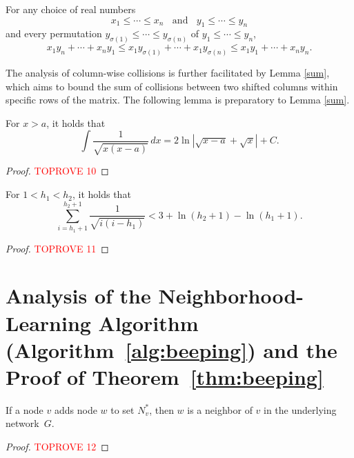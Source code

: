 \documentclass[11pt]{article}
\begin{document}
\begin{theorem}\label{th:hardy}
	For any choice of real numbers
	\[
	x_1 \le \cdots \le x_n \;\;\text{ and }\;\;  y_1 \le \cdots \le y_n
	\]
	and every permutation $y_{\sigma(1)} \le \cdots \le y_{\sigma(n)}$ 
	of $y_1 \le \cdots \le y_n$,
	\begin{equation}\label{rearrange}
	x_1 y_n + \cdots + x_n y_1 
	\le x_1 y_{\sigma(1)} + \cdots + x_1 y_{\sigma(n)} 
	\le x_1 y_1 + \cdots + x_n y_n.	    
	\end{equation}
\end{theorem}

The analysis of column-wise collisions is further facilitated by Lemma \ref{sum}, 
which aims to bound the sum of collisions between two shifted columns within specific rows 
of the matrix. 
The following lemma is preparatory to Lemma \ref{sum}.


\begin{lemma}\label{integral}
For $x > a$, it holds that
    \[
    \int \frac{1}{\sqrt{x(x-a)}}\, dx = 2 \ln\left|  \sqrt{x - a} + \sqrt{x} \right| + C.
    \]
\end{lemma}
\begin{proof}\textcolor{red}{TOPROVE 10}\end{proof}

\begin{lemma}\label{sum}
For $1 < h_1 < h_2$, it holds that
     \[
     \sum_{i = h_1 + 1}^{h_2 + 1} \frac{1}{\sqrt{i(i- h_1)}} 
     < 3 + \ln\left( {h_2+1} \right) - \ln\left({h_1+1}\right) .
     \]
\end{lemma}

\begin{proof}\textcolor{red}{TOPROVE 11}\end{proof}




\section{Analysis of the Neighborhood-Learning Algorithm (Algorithm~\ref{alg:beeping}) and the Proof of Theorem~\ref{thm:beeping}}\label{app:neigh}


\begin{lemma}[Safety]
\label{lem:beeping-reliability}
If a node $v$ adds node $w$ to set $N^*_v$, then $w$ is a neighbor of $v$ in the underlying network~$G$.
\end{lemma}

\begin{proof}\textcolor{red}{TOPROVE 12}\end{proof}
\end{document}
